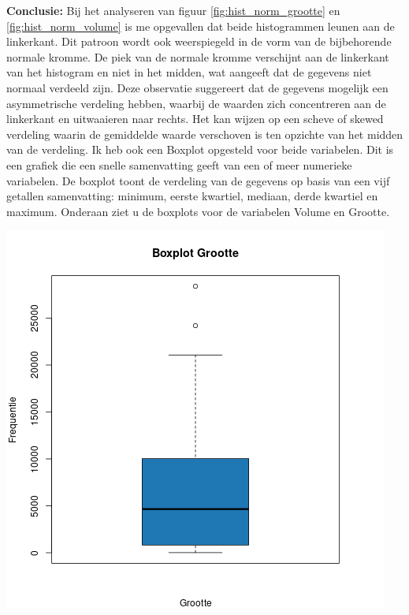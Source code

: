 \documentclass[12pt]{article}
\begin{document}
\newline\newline\newline  
\textbf{Conclusie:} Bij het analyseren van figuur \ref{fig:hist_norm_grootte} en \ref{fig:hist_norm_volume} is me opgevallen dat beide histogrammen leunen aan de linkerkant. 
Dit patroon wordt ook weerspiegeld in de vorm van de bijbehorende normale kromme. 
De piek van de normale kromme verschijnt aan de linkerkant van het histogram en niet in het midden, wat aangeeft dat de gegevens niet normaal verdeeld zijn.
Deze observatie suggereert dat de gegevens mogelijk een asymmetrische verdeling hebben, waarbij de waarden zich concentreren aan de linkerkant en uitwaaieren naar rechts. 
Het kan wijzen op een scheve of skewed verdeling waarin de gemiddelde waarde verschoven is ten opzichte van het midden van de verdeling.
\newline\newline
Ik heb ook een Boxplot opgesteld voor beide variabelen. Dit is een grafiek die een snelle samenvatting geeft van een of meer numerieke variabelen.
De boxplot toont de verdeling van de gegevens op basis van een vijf getallen samenvatting: minimum, eerste kwartiel, mediaan, derde kwartiel en maximum.
Onderaan ziet u de boxplots voor de variabelen Volume en Grootte.
\newline\newline
\noindent\begin{minipage}{0.5\linewidth}
    \centering
    \includegraphics[width=\linewidth]{vragen/vraag1/images/box_grootte.png}
    \label{fig:boxplot_grootte}
\end{minipage}
\end{document}
